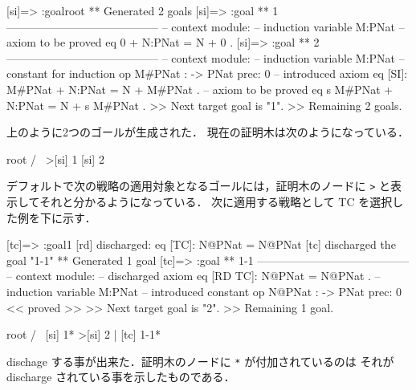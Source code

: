 \documentclass[a4paper,oneside,10pt,here]{memoir}
\newenvironment{vvtm}%
{\parskip=0pt\lineskip=0pt\begin{center}\begin{minipage}{0.8\textwidth}\begin{snugshade}}%
  {\end{snugshade}\end{minipage}\end{center}}
\begin{document}
\begin{vvtm}
  \begin{simplev}

[si]=> :goal{root}
** Generated 2 goals
[si]=>
:goal { ** 1 -----------------------------------------
  -- context module: %
  -- induction variable
    M:PNat
  -- axiom to be proved
    eq 0 + N:PNat = N + 0 .
}
[si]=>
:goal { ** 2 -----------------------------------------
  -- context module: %
  -- induction variable
    M:PNat
  -- constant for induction
    op M#PNat : -> PNat { prec: 0 }
  -- introduced axiom
    eq [SI]: M#PNat + N:PNat = N + M#PNat .
  -- axiom to be proved
    eq s M#PNat + N:PNat = N + s M#PNat .
}
>> Next target goal is "1".
>> Remaining 2 goals.
  \end{simplev}
\end{vvtm}

上のように2つのゴールが生成された．
現在の証明木は次のようになっている．
\begin{vvtm}
  \begin{simplev}
     root      
   /        \   
>[si] 1  [si] 2
  \end{simplev}
\end{vvtm}

デフォルトで次の戦略の適用対象となるゴールには，証明木のノードに
\verb|>| と表示してそれと分かるようになっている．
次に適用する戦略として TC を選択した例を下に示す．

\begin{vvtm}
  \begin{simplev}
[tc]=> :goal{1}
[rd] discharged: 
  eq [TC]: N@PNat = N@PNat
[tc] discharged the goal "1-1"
** Generated 1 goal
[tc]=>
:goal { ** 1-1 -----------------------------------------
  -- context module: %
  -- discharged axiom
    eq [RD TC]: N@PNat = N@PNat .
  -- induction variable
    M:PNat
  -- introduced constant
    op N@PNat : -> PNat { prec: 0 }
} << proved >>
>> Next target goal is "2".
>> Remaining 1 goal.

       root       
    /         \    
 [si] 1*   >[si] 2
    |              
[tc] 1-1*        
  \end{simplev}
\end{vvtm}
dischage する事が出来た．証明木のノードに \verb|*| が付加されているのは
それが discharge されている事を示したものである．
\end{document}

